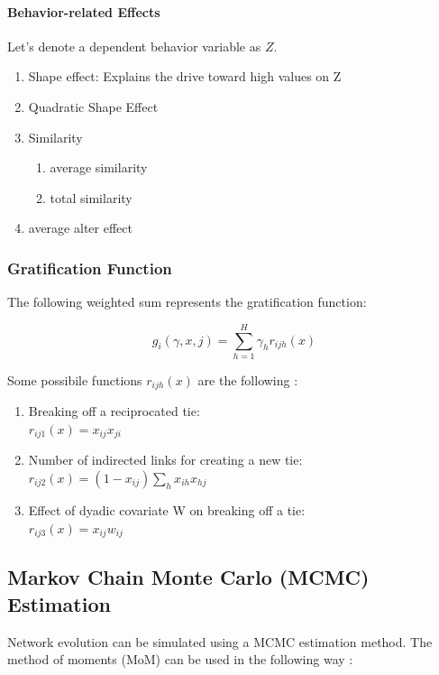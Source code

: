\documentclass[11pt]{report}
\begin{document}
\paragraph{Behavior-related Effects\\}
Let's denote a dependent behavior variable as $Z$.
\begin{enumerate}
\item{Shape effect: Explains the drive toward high values on Z}

\item{Quadratic Shape Effect}
\item{Similarity}
\begin{enumerate}
\item{average similarity}
\item{total similarity}
\end{enumerate}
\item{average alter effect}
\end{enumerate}

\subsubsection{Gratification Function}
The following weighted sum represents the gratification function:

\begin{equation}
g_i(\gamma, x, j) = \sum_{h = 1}^{H} \gamma_h r_{ijh}(x)
\end{equation}

Some possibile functions $r_{ijh}(x)$ are the following \cite{Snijders2004}:
\begin{enumerate}
\item Breaking off a reciprocated tie:\\ 
$r_{ij1}(x) = x_{ij} x_{ji}$
\item Number of indirected links for creating a new tie:\\ $r_{ij2}(x) = (1 - x_{ij}) \sum_h x_{ih} x_{hj}$
\item Effect of dyadic covariate W on breaking off a tie:\\
$r_{ij3}(x) = x_{ij}w_{ij}$
\end{enumerate}

\subsection{Markov Chain Monte Carlo (MCMC) Estimation}
Network evolution can be simulated using a MCMC estimation method. The method of moments (MoM) can be used in the following way \cite{Snijders2004}: \\
\end{document}
